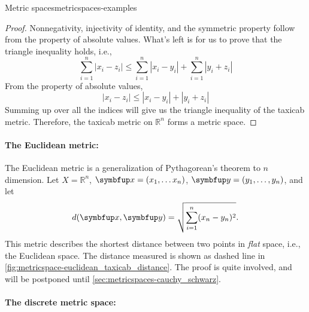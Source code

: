 \begin{exmp}{Metric spaces}{metricspaces-examples}
  \begin{proof}
    Nonnegativity, injectivity of identity, and the symmetric property follow from the property
    of absolute values. What's left is for us to prove that the triangle inequality holds, i.e.,
    \begin{equation}
      \sum_{i=1}^{n}|x_i - z_i| \leq \sum_{i=1}^n |x_i - y_i| + \sum_{i=1}^n |y_i + z_i|
    \end{equation}
    From the property of absolute values,
    \begin{equation}
      |x_i - z_i| \leq |x_i - y_i| + |y_i + z_i|
    \end{equation}
    Summing up over all the indices will give us the triangle inequality of the taxicab
    metric. Therefore, the taxicab metric on \(\mathbb{R}^n\) forms a metric space.
  \end{proof}

  \paragraph{The Euclidean metric:}

  The Euclidean metric is a generalization of Pythagorean's theorem to \(n\) dimension.
  Let \(X = \mathbb{R}^n\), \(\vv{x} = (x_1, \dots x_n)\), \(\vv{y} = (y_1, \dots, y_n)\), and let
  \begin{equation}
    d(\vv{x}, \vv{y}) = \sqrt{\sum_{i=1}^n (x_n - y_n)^2}.
  \end{equation}
  This metric describes the shortest distance between two points in \emph{flat}
  space, i.e., the Euclidean space. The distance measured is shown as dashed line in
  \cref{fig:metricspace-euclidean_taxicab_distance}. The proof is quite involved, and will be
  postponed until \cref{sec:metricspaces-cauchy_schwarz}.

  \paragraph{The discrete metric space:}


\end{exmp}
